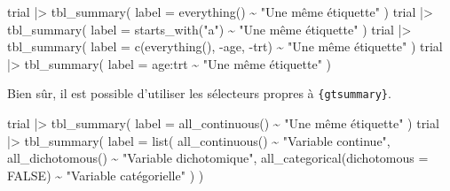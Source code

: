 \documentclass[
  letterpaper,
  DIV=11,
  numbers=noendperiod,
  oneside]{scrreprt}
\newenvironment{Shaded}{\begin{snugshade}}{\end{snugshade}}
\newcommand{\AttributeTok}[1]{\textcolor[rgb]{0.40,0.45,0.13}{#1}}
\newcommand{\ConstantTok}[1]{\textcolor[rgb]{0.56,0.35,0.01}{#1}}
\newcommand{\FunctionTok}[1]{\textcolor[rgb]{0.28,0.35,0.67}{#1}}
\newcommand{\NormalTok}[1]{\textcolor[rgb]{0.00,0.23,0.31}{#1}}
\newcommand{\SpecialCharTok}[1]{\textcolor[rgb]{0.37,0.37,0.37}{#1}}
\newcommand{\StringTok}[1]{\textcolor[rgb]{0.13,0.47,0.30}{#1}}
\begin{document}
\begin{tcolorbox}
\begin{Shaded}
\begin{Highlighting}[]
\NormalTok{trial }\SpecialCharTok{|\textgreater{}} 
  \FunctionTok{tbl\_summary}\NormalTok{(}
    \AttributeTok{label =} \FunctionTok{everything}\NormalTok{() }\SpecialCharTok{\textasciitilde{}} \StringTok{"Une même étiquette"}
\NormalTok{  )}
\NormalTok{trial }\SpecialCharTok{|\textgreater{}} 
  \FunctionTok{tbl\_summary}\NormalTok{(}
    \AttributeTok{label =} \FunctionTok{starts\_with}\NormalTok{(}\StringTok{"a"}\NormalTok{) }\SpecialCharTok{\textasciitilde{}} \StringTok{"Une même étiquette"}
\NormalTok{  )}
\NormalTok{trial }\SpecialCharTok{|\textgreater{}} 
  \FunctionTok{tbl\_summary}\NormalTok{(}
    \AttributeTok{label =} \FunctionTok{c}\NormalTok{(}\FunctionTok{everything}\NormalTok{(), }\SpecialCharTok{{-}}\NormalTok{age, }\SpecialCharTok{{-}}\NormalTok{trt) }\SpecialCharTok{\textasciitilde{}} \StringTok{"Une même étiquette"}
\NormalTok{  )}
\NormalTok{trial }\SpecialCharTok{|\textgreater{}} 
  \FunctionTok{tbl\_summary}\NormalTok{(}
    \AttributeTok{label =}\NormalTok{ age}\SpecialCharTok{:}\NormalTok{trt }\SpecialCharTok{\textasciitilde{}} \StringTok{"Une même étiquette"}
\NormalTok{  )}
\end{Highlighting}
\end{Shaded}

Bien sûr, il est possible d'utiliser les sélecteurs propres à
\texttt{\{gtsummary\}}.

\begin{Shaded}
\begin{Highlighting}[]
\NormalTok{trial }\SpecialCharTok{|\textgreater{}} 
  \FunctionTok{tbl\_summary}\NormalTok{(}
    \AttributeTok{label =} \FunctionTok{all\_continuous}\NormalTok{() }\SpecialCharTok{\textasciitilde{}} \StringTok{"Une même étiquette"}
\NormalTok{  )}
\NormalTok{trial }\SpecialCharTok{|\textgreater{}} 
  \FunctionTok{tbl\_summary}\NormalTok{(}
    \AttributeTok{label =} \FunctionTok{list}\NormalTok{(}
      \FunctionTok{all\_continuous}\NormalTok{() }\SpecialCharTok{\textasciitilde{}} \StringTok{"Variable continue"}\NormalTok{,}
      \FunctionTok{all\_dichotomous}\NormalTok{() }\SpecialCharTok{\textasciitilde{}} \StringTok{"Variable dichotomique"}\NormalTok{,}
      \FunctionTok{all\_categorical}\NormalTok{(}\AttributeTok{dichotomous =} \ConstantTok{FALSE}\NormalTok{) }\SpecialCharTok{\textasciitilde{}} \StringTok{"Variable catégorielle"}
\NormalTok{    )}
\NormalTok{  )}
\end{Highlighting}
\end{Shaded}


\end{tcolorbox}
\end{document}
